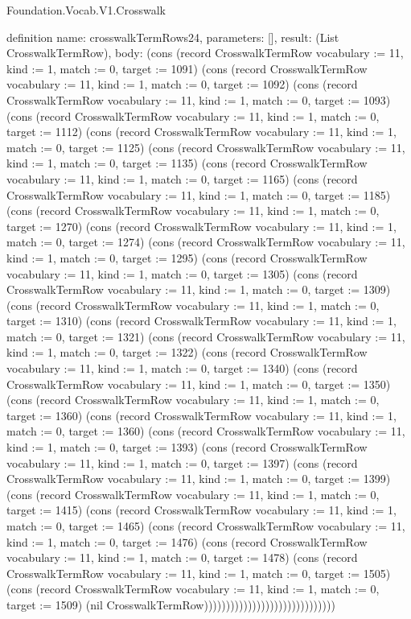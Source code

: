 \begin{lexlean}{Foundation.Vocab.V1.Crosswalk}
\begin{semanticmodule}
definition{
  name: crosswalkTermRows24,
  parameters: [],
  result: (List CrosswalkTermRow),
  body: (cons (record CrosswalkTermRow {vocabulary := 11, kind := 1, match := 0, target := 1091}) (cons (record CrosswalkTermRow {vocabulary := 11, kind := 1, match := 0, target := 1092}) (cons (record CrosswalkTermRow {vocabulary := 11, kind := 1, match := 0, target := 1093}) (cons (record CrosswalkTermRow {vocabulary := 11, kind := 1, match := 0, target := 1112}) (cons (record CrosswalkTermRow {vocabulary := 11, kind := 1, match := 0, target := 1125}) (cons (record CrosswalkTermRow {vocabulary := 11, kind := 1, match := 0, target := 1135}) (cons (record CrosswalkTermRow {vocabulary := 11, kind := 1, match := 0, target := 1165}) (cons (record CrosswalkTermRow {vocabulary := 11, kind := 1, match := 0, target := 1185}) (cons (record CrosswalkTermRow {vocabulary := 11, kind := 1, match := 0, target := 1270}) (cons (record CrosswalkTermRow {vocabulary := 11, kind := 1, match := 0, target := 1274}) (cons (record CrosswalkTermRow {vocabulary := 11, kind := 1, match := 0, target := 1295}) (cons (record CrosswalkTermRow {vocabulary := 11, kind := 1, match := 0, target := 1305}) (cons (record CrosswalkTermRow {vocabulary := 11, kind := 1, match := 0, target := 1309}) (cons (record CrosswalkTermRow {vocabulary := 11, kind := 1, match := 0, target := 1310}) (cons (record CrosswalkTermRow {vocabulary := 11, kind := 1, match := 0, target := 1321}) (cons (record CrosswalkTermRow {vocabulary := 11, kind := 1, match := 0, target := 1322}) (cons (record CrosswalkTermRow {vocabulary := 11, kind := 1, match := 0, target := 1340}) (cons (record CrosswalkTermRow {vocabulary := 11, kind := 1, match := 0, target := 1350}) (cons (record CrosswalkTermRow {vocabulary := 11, kind := 1, match := 0, target := 1360}) (cons (record CrosswalkTermRow {vocabulary := 11, kind := 1, match := 0, target := 1360}) (cons (record CrosswalkTermRow {vocabulary := 11, kind := 1, match := 0, target := 1393}) (cons (record CrosswalkTermRow {vocabulary := 11, kind := 1, match := 0, target := 1397}) (cons (record CrosswalkTermRow {vocabulary := 11, kind := 1, match := 0, target := 1399}) (cons (record CrosswalkTermRow {vocabulary := 11, kind := 1, match := 0, target := 1415}) (cons (record CrosswalkTermRow {vocabulary := 11, kind := 1, match := 0, target := 1465}) (cons (record CrosswalkTermRow {vocabulary := 11, kind := 1, match := 0, target := 1476}) (cons (record CrosswalkTermRow {vocabulary := 11, kind := 1, match := 0, target := 1478}) (cons (record CrosswalkTermRow {vocabulary := 11, kind := 1, match := 0, target := 1505}) (cons (record CrosswalkTermRow {vocabulary := 11, kind := 1, match := 0, target := 1509}) (nil CrosswalkTermRow))))))))))))))))))))))))))))))
}


\end{semanticmodule}
\end{lexlean}
